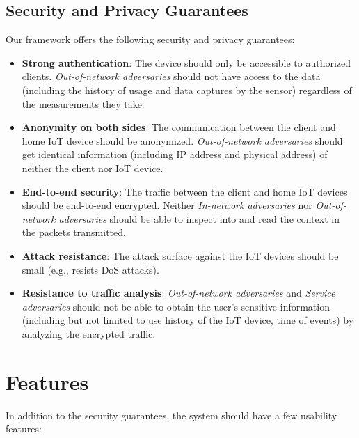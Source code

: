 \subsection{Security and Privacy Guarantees}

Our framework offers the following security and privacy guarantees:

\begin{itemize}
	\item \textbf{Strong authentication}: The device should only be accessible to authorized clients. \textit{Out-of-network adversaries} should not have access to the data (including the history of usage and data captures by the sensor) regardless of the measurements they take.
	\item \textbf{Anonymity on both sides}: The communication between the client and home IoT device should be anonymized. \textit{Out-of-network adversaries} should get identical information (including IP address and physical address) of neither the client nor IoT device.
	\item \textbf{End-to-end security}: The traffic between the client and home IoT devices should be end-to-end encrypted. Neither \textit{In-network adversaries} nor \textit{Out-of-network adversaries} should be able to inspect into and read the context in the packets transmitted.
	\item \textbf{Attack resistance}: The attack surface against the IoT devices should be small (e.g., resists DoS attacks).
	\item \textbf{Resistance to traffic analysis}: \textit{Out-of-network adversaries} and \textit{Service adversaries} should not be able to obtain the user's sensitive information (including but not limited to use history of the IoT device, time of events) by analyzing the encrypted traffic.
\end{itemize}

\section{Features}
In addition to the security guarantees, the system should have a few usability features:

